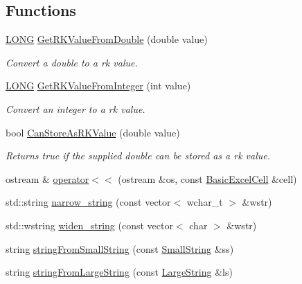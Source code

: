 \subsection*{Functions}
\begin{DoxyCompactItemize}
\item 
\hyperlink{_basic_excel_8hpp_a9154c0d0c21af4686624543215b4e5f2}{L\+O\+N\+G} \hyperlink{namespace_y_excel_a3bd16b333c9e569d592e12abb1336816}{Get\+R\+K\+Value\+From\+Double} (double value)
\begin{DoxyCompactList}\small\item\em Convert a double to a rk value. \end{DoxyCompactList}\item 
\hyperlink{_basic_excel_8hpp_a9154c0d0c21af4686624543215b4e5f2}{L\+O\+N\+G} \hyperlink{namespace_y_excel_a25be450bffe3e7630af9104c14c89766}{Get\+R\+K\+Value\+From\+Integer} (int value)
\begin{DoxyCompactList}\small\item\em Convert an integer to a rk value. \end{DoxyCompactList}\item 
bool \hyperlink{namespace_y_excel_aafa180eb1bc8c93be75a4d7eb82d27f7}{Can\+Store\+As\+R\+K\+Value} (double value)
\begin{DoxyCompactList}\small\item\em Returns true if the supplied double can be stored as a rk value. \end{DoxyCompactList}\item 
ostream \& \hyperlink{namespace_y_excel_a505051d78d0199ac914cb2605c4c69bc}{operator$<$$<$} (ostream \&os, const \hyperlink{class_y_excel_1_1_basic_excel_cell}{Basic\+Excel\+Cell} \&cell)
\item 
std\+::string \hyperlink{namespace_y_excel_af2ec313b6a3ecb290158209b7d1c419a}{narrow\+\_\+string} (const vector$<$ wchar\+\_\+t $>$ \&wstr)
\item 
std\+::wstring \hyperlink{namespace_y_excel_ace386a57aff7d49a31b516fc3718fdb3}{widen\+\_\+string} (const vector$<$ char $>$ \&wstr)
\item 
string \hyperlink{namespace_y_excel_a1352b77fe7b058047b525fb1a8d68e0a}{string\+From\+Small\+String} (const \hyperlink{struct_y_excel_1_1_small_string}{Small\+String} \&ss)
\item 
string \hyperlink{namespace_y_excel_a852a86fb808075499fa9280dd5a1825e}{string\+From\+Large\+String} (const \hyperlink{struct_y_excel_1_1_large_string}{Large\+String} \&ls)
\item 

\end{DoxyCompactItemize}
